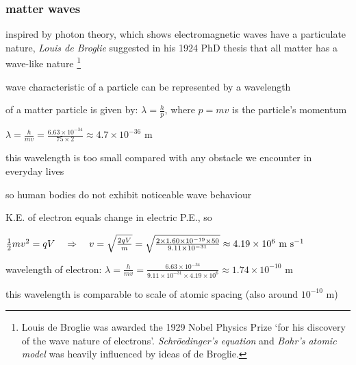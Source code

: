 \subsubsection{matter waves}

inspired by photon theory, which shows electromagnetic waves have a particulate nature, \emph{Louis de Broglie} suggested in his 1924 PhD thesis that all matter has a wave-like nature
\footnote{Louis de Broglie was awarded the 1929 Nobel Physics Prize `for his discovery of the wave nature of electrons'. \emph{Schr\"oedinger's equation} and \emph{Bohr's atomic model} was heavily influenced by ideas of de Broglie.}

wave characteristic of a particle can be represented by a wavelength

\begin{ilight}
	 of a matter particle is given by: $\boxed{\lambda = \frac{h}{p}}$, where $p=mv$ is the particle's momentum
\end{ilight}


\sol $\lambda = \frac{h}{mv} = \frac{6.63\times10^{-34}}{75\times 2} \approx 4.7\times 10^{-36} \text{ m}$

this wavelength is too small compared with any obstacle we encounter in everyday lives

so human bodies do not exhibit noticeable wave behaviour \eoe


K.E. of electron equals change in electric P.E., so

{
	
	\centering
	
	$\frac{1}{2}mv^2 = qV \quad \Rightarrow \quad v = \sqrt{\frac{2qV}{m}} = \sqrt{\frac{2\times1.60\times 10^{-19} \times 50}{9.11\times10^{-31}}} \approx 4.19\times10^6 \text{ m s$^{-1}$}$
	
}

\eqyskip

wavelength of electron: $\lambda = \frac{h}{mv} = \frac{6.63\times10^{-34}}{9.11\times10^{-31}\times 4.19\times10^6} \approx 1.74 \times10^{-10} \text{ m}$

this wavelength is comparable to scale of atomic spacing (also around $10^{-10}\text{ m}$)

